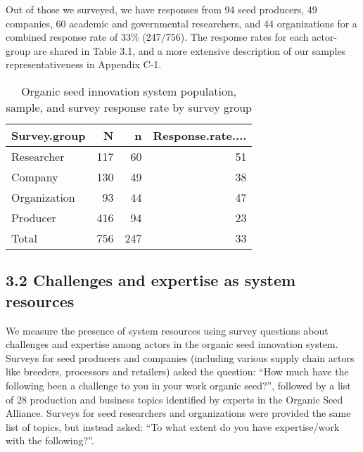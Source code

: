 \documentclass[twoside,12pt,final]{ucthesis-CA2012}
\begin{document}
\begin{ucmainmatter}
Out of those we surveyed, we have responses from 94 seed producers, 49
companies, 60 academic and governmental researchers, and 44
organizations for a combined response rate of 33\% (247/756). The
response rates for each actor-group are shared in Table 3.1, and a more
extensive description of our sample\textquotesingle s representativeness in Appendix
C-1.
\begin{table}

\caption{\label{tab:unnamed-chunk-23}Organic seed innovation system population, sample, and survey response rate by survey group}
\centering
\begin{tabular}[t]{lrrr}
\toprule
Survey.group & N & n & Response.rate....\\
\midrule
Researcher & 117 & 60 & 51\\
Company & 130 & 49 & 38\\
Organization & 93 & 44 & 47\\
Producer & 416 & 94 & 23\\
Total & 756 & 247 & 33\\
\bottomrule
\end{tabular}
\end{table}
\hypertarget{challenges-and-expertise-as-system-resources}{%
\subsection{3.2 Challenges and expertise as system resources}\label{challenges-and-expertise-as-system-resources}}

We measure the presence of system resources using survey questions about
challenges and expertise among actors in the organic seed innovation
system. Surveys for seed producers and companies (including various
supply chain actors like breeders, processors and retailers) asked the
question: ``How much have the following been a challenge to you in your
work organic seed?'', followed by a list of 28 production and business
topics identified by experts in the Organic Seed Alliance. Surveys for
seed researchers and organizations were provided the same list of
topics, but instead asked: ``To what extent do you have expertise/work
with the following?''.


\end{ucmainmatter}
\end{document}
